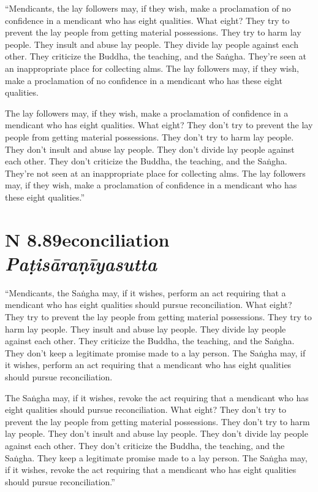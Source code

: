 \documentclass[12pt,openany]{book}%
\newcommand*{\suttatitleacronym}[1]{\smaller[2]{#1}\vspace*{.3em}}
\newcommand*{\suttatitletranslation}[1]{\linebreak{#1}}
\newcommand*{\suttatitleroot}[1]{\linebreak\smaller[2]\itshape{#1}}
\newcommand*{\tocacronym}[1]{\hspace*{-3.3em}{#1}\quad}
\newcommand*{\toctranslation}[1]{#1}
\newcommand*{\tocroot}[1]{(\textit{#1})}
\begin{document}
“Mendicants, the lay followers may, if they wish, make a proclamation of no confidence in a mendicant who has eight qualities. What eight? They try to prevent the lay people from getting material possessions. They try to harm lay people. They insult and abuse lay people. They divide lay people against each other. They criticize the Buddha, the teaching, and the \textsanskrit{Saṅgha}. They’re seen at an inappropriate place for collecting alms. The lay followers may, if they wish, make a proclamation of no confidence in a mendicant who has these eight qualities. 

The lay followers may, if they wish, make a proclamation of confidence in a mendicant who has eight qualities. What eight? They don’t try to prevent the lay people from getting material possessions. They don’t try to harm lay people. They don’t insult and abuse lay people. They don’t divide lay people against each other. They don’t criticize the Buddha, the teaching, and the \textsanskrit{Saṅgha}. They’re not seen at an inappropriate place for collecting alms. The lay followers may, if they wish, make a proclamation of confidence in a mendicant who has these eight qualities.” 

%
\section*{{\suttatitleacronym AN 8.89}{\suttatitletranslation Reconciliation }{\suttatitleroot Paṭisāraṇīyasutta}}
\addcontentsline{toc}{section}{\tocacronym{AN 8.89} \toctranslation{Reconciliation } \tocroot{Paṭisāraṇīyasutta}}

“Mendicants, the \textsanskrit{Saṅgha} may, if it wishes, perform an act requiring that a mendicant who has eight qualities should pursue reconciliation. What eight? They try to prevent the lay people from getting material possessions. They try to harm lay people. They insult and abuse lay people. They divide lay people against each other. They criticize the Buddha, the teaching, and the \textsanskrit{Saṅgha}. They don’t keep a legitimate promise made to a lay person. The \textsanskrit{Saṅgha} may, if it wishes, perform an act requiring that a mendicant who has eight qualities should pursue reconciliation. 

The \textsanskrit{Saṅgha} may, if it wishes, revoke the act requiring that a mendicant who has eight qualities should pursue reconciliation. What eight? They don’t try to prevent the lay people from getting material possessions. They don’t try to harm lay people. They don’t insult and abuse lay people. They don’t divide lay people against each other. They don’t criticize the Buddha, the teaching, and the \textsanskrit{Saṅgha}. They keep a legitimate promise made to a lay person. The \textsanskrit{Saṅgha} may, if it wishes, revoke the act requiring that a mendicant who has eight qualities should pursue reconciliation.” 
\end{document}
